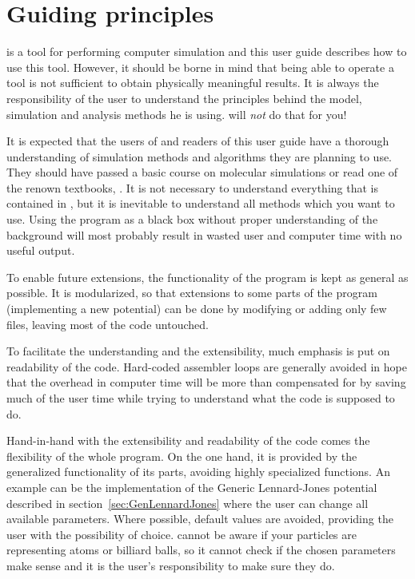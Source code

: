 \section{Guiding principles}
\label{sec:ideas}

\es is a tool for performing computer simulation and this user guide
describes how to use this tool. However, it should be borne in mind
that being able to operate a tool is not sufficient to obtain 
physically meaningful results. It is always the responsibility of the user
to understand the principles behind the model, simulation
and analysis methods he is using. \es will \emph{not} do that for you!

It is expected that the users of \es and readers of this user guide
have a thorough understanding of simulation methods and algorithms
they are planning to use. They should have passed a basic course on
molecular simulations or read one of the renown textbooks, \eg
\cite{frenkel02b}.  It is not necessary to understand everything that
is contained in \es, but it is inevitable to understand all methods
which you want to use.  Using the program as a black box without
proper understanding of the background will most probably result in
wasted user and computer time with no useful output.

To enable future extensions, the functionality of the program is kept
as general as possible.  It is modularized, so that extensions to some
parts of the program (\eg implementing a new potential) can be done by
modifying or adding only few files, leaving most of the code
untouched.

To facilitate the understanding and the extensibility, much emphasis
is put on readability of the code.  Hard-coded assembler loops are
generally avoided in hope that the overhead in computer time will be
more than compensated for by saving much of the user time while trying
to understand what the code is supposed to do.

Hand-in-hand with the extensibility and readability of the code comes
the flexibility of the whole program.  On the one hand, it is provided
by the generalized functionality of its parts, avoiding highly
specialized functions.  An example can be the implementation of the
Generic Lennard-Jones potential described in
section~\ref{sec:GenLennardJones} where the user can change all
available parameters. Where possible, default values are avoided,
providing the user with the possibility of choice.  \es cannot be
aware if your particles are representing atoms or billiard balls, so
it cannot check if the chosen parameters make sense and it is the
user's responsibility to make sure they do.

